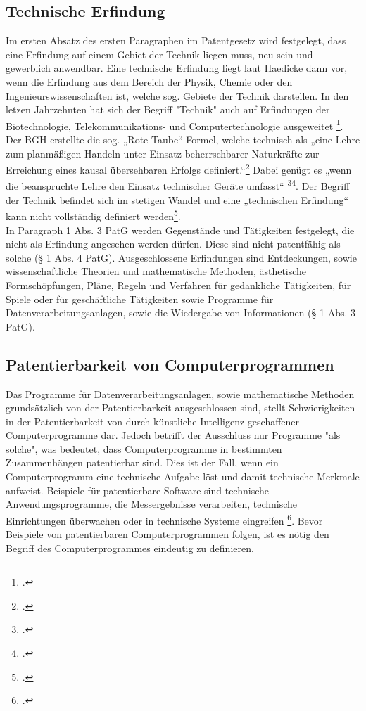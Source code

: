 \subsection{Technische Erfindung \label{sec:tecer}}

Im ersten Absatz des ersten Paragraphen im Patentgesetz wird festgelegt,
dass eine Erfindung auf einem Gebiet der Technik liegen muss, neu sein und
gewerblich anwendbar.
Eine technische Erfindung liegt laut Haedicke dann vor, 
wenn die Erfindung aus dem Bereich der Physik, 
Chemie oder den Ingenieurswissenschaften ist, 
welche sog. Gebiete der Technik darstellen.
In den letzen Jahrzehnten hat sich der Begriff 
"Technik" auch auf Erfindungen der Biotechnologie, 
Telekommunikations- und Computertechnologie ausgeweitet 
\footcite{haedickeEinfuhrung2020}.
Der \gls{BGH} erstellte die
sog. „Rote-Taube“-Formel, welche technisch als  
„eine Lehre zum planmäßigen Handeln 
unter Einsatz beherrschbarer Naturkräfte zur Erreichung eines 
kausal übersehbaren Erfolgs definiert.“\footcite{BGH27031969}  
Dabei genügt es „wenn die beanspruchte Lehre den Einsatz technischer Geräte umfasst“
\footcite{BGH3020152015}\footcite{BGH2420112011}. 
Der Begriff der Technik befindet sich im stetigen Wandel und eine „technischen Erfindung“ 
kann nicht vollständig definiert werden\footcite{haedickeEinfuhrung2020}.
\\
In Paragraph 1 Abs. 3 PatG werden Gegenstände und Tätigkeiten festgelegt, 
die nicht als Erfindung angesehen werden dürfen. 
Diese sind nicht patentfähig als solche (§ 1 Abs. 4 PatG). 
Ausgeschlossene Erfindungen sind Entdeckungen, 
sowie wissenschaftliche Theorien und mathematische Methoden, 
ästhetische Formschöpfungen, Pläne, Regeln und Verfahren für gedankliche Tätigkeiten, 
für Spiele 
oder für geschäftliche Tätigkeiten sowie Programme für Datenverarbeitungsanlagen, 
sowie die Wiedergabe von Informationen (§ 1 Abs. 3 PatG). 
\\

\subsection{Patentierbarkeit von Computerprogrammen}
Das Programme für Datenverarbeitungsanlagen, sowie mathematische Methoden grundsätzlich
von der Patentierbarkeit ausgeschlossen sind, stellt Schwierigkeiten in der 
Patentierbarkeit von durch künstliche
Intelligenz geschaffener Computerprogramme dar. 
Jedoch betrifft der Ausschluss nur Programme "als solche", 
was bedeutet, 
dass Computerprogramme in bestimmten Zusammenhängen patentierbar sind.
Dies ist der Fall,
wenn ein Computerprogramm eine technische Aufgabe löst
und damit technische Merkmale aufweist.
Beispiele für patentierbare Software sind technische Anwendungsprogramme, 
die Messergebnisse verarbeiten, 
technische Einrichtungen überwachen oder in technische Systeme eingreifen
\footcite{RedekerITRechtSchutz}.
Bevor Beispiele von patentierbaren Computerprogrammen folgen, ist es
nötig den Begriff des Computerprogrammes eindeutig zu definieren.
